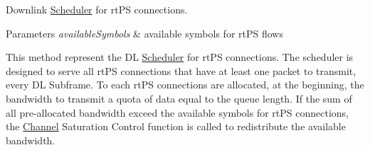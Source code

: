 Downlink \hyperlink{classns3_1_1Scheduler}{Scheduler} for rt\+PS connections. 


\begin{DoxyParams}{Parameters}
{\em available\+Symbols} & available symbols for rt\+PS flows\\
\hline
\end{DoxyParams}
This method represent the DL \hyperlink{classns3_1_1Scheduler}{Scheduler} for rt\+PS connections. The scheduler is designed to serve all rt\+PS connections that have at least one packet to transmit, every DL Subframe. To each rt\+PS connections are allocated, at the beginning, the bandwidth to transmit a quota of data equal to the queue length. If the sum of all pre-\/allocated bandwidth exceed the available symbols for rt\+PS connections, the \hyperlink{classns3_1_1Channel}{Channel} Saturation Control function is called to redistribute the available bandwidth. 
